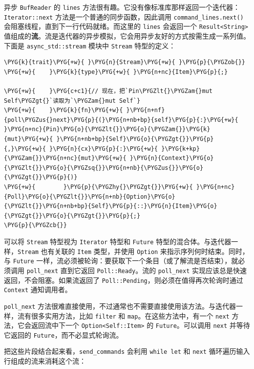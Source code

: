 异步 \texttt{BufReader} 的 \texttt{lines} 方法很有趣。它没有像标准库那样返回一个迭代器：\texttt{Iterator::next} 方法是一个普通的同步函数，因此调用 \texttt{command\_lines.next()} 会阻塞线程，直到下一行代码就绪。而这里的 \texttt{lines} 会返回一个 \texttt{Result<String>} 值组成的\textbf{流}。流是迭代器的异步模拟，它会用异步友好的方式按需生成一系列值。下面是 \texttt{async\_std::stream} 模块中 \texttt{Stream} 特型的定义：

\begin{Verbatim}[commandchars=\\\{\},breaklines=true,breakanywhere=true,fontsize=\codefont,xleftmargin=17bp]
\PYG{k}{trait}\PYG{+w}{ }\PYG{n}{Stream}\PYG{+w}{ }\PYG{p}{\PYGZob{}}
\PYG{+w}{    }\PYG{k}{type}\PYG{+w}{ }\PYG{n+nc}{Item}\PYG{p}{;}

\PYG{+w}{    }\PYG{c+c1}{// 现在，把`Pin\PYGZlt{}\PYGZam{}mut Self\PYGZgt{}`读取为`\PYGZam{}mut Self`}
\PYG{+w}{    }\PYG{k}{fn}\PYG{+w}{ }\PYG{n+nf}{poll\PYGZus{}next}\PYG{p}{(}\PYG{n+nb+bp}{self}\PYG{p}{:}\PYG{+w}{ }\PYG{n+nc}{Pin}\PYG{o}{\PYGZlt{}}\PYG{o}{\PYGZam{}}\PYG{k}{mut}\PYG{+w}{ }\PYG{n+nb+bp}{Self}\PYG{o}{\PYGZgt{}}\PYG{p}{,}\PYG{+w}{ }\PYG{n}{cx}\PYG{p}{:}\PYG{+w}{ }\PYG{k+kp}{\PYGZam{}}\PYG{n+nc}{mut}\PYG{+w}{ }\PYG{n}{Context}\PYG{o}{\PYGZlt{}}\PYG{o}{\PYGZsq{}}\PYG{n+nb}{\PYGZus{}}\PYG{o}{\PYGZgt{}}\PYG{p}{)}
\PYG{+w}{        }\PYG{p}{\PYGZhy{}\PYGZgt{}}\PYG{+w}{ }\PYG{n+nc}{Poll}\PYG{o}{\PYGZlt{}}\PYG{n+nb}{Option}\PYG{o}{\PYGZlt{}}\PYG{n+nb+bp}{Self}\PYG{p}{::}\PYG{n}{Item}\PYG{o}{\PYGZgt{}}\PYG{o}{\PYGZgt{}}\PYG{p}{;}
\PYG{p}{\PYGZcb{}}
\end{Verbatim}

可以将 \texttt{Stream} 特型视为 \texttt{Iterator} 特型和 \texttt{Future} 特型的混合体。与迭代器一样，\texttt{Stream} 也有关联的 \texttt{Item} 类型，并使用 \texttt{Option} 来指示序列何时结束。同时，与 \texttt{Future} 一样，流必须被轮询：要获取下一个条目（或了解流是否结束），就必须调用 \texttt{poll\_next} 直到它返回 \texttt{Poll::Ready}。流的 \texttt{poll\_next} 实现应该总是快速返回，不会阻塞。如果流返回了 \texttt{Poll::Pending}，则必须在值得再次轮询时通过 \texttt{Context} 通知调用者。

\texttt{poll\_next} 方法很难直接使用，不过通常也不需要直接使用该方法。与迭代器一样，流有很多实用方法，比如 \texttt{filter} 和 \texttt{map}。在这些方法中，有一个 \texttt{next} 方法，它会返回流中下一个 \texttt{Option<Self::Item>} 的 \texttt{Future}。可以调用 \texttt{next} 并等待它返回的 \texttt{Future}，而不必显式轮询流。

把这些片段结合起来看，\texttt{send\_commands} 会利用 \texttt{while let} 和 \texttt{next} 循环遍历输入行组成的流来消耗这个流：

